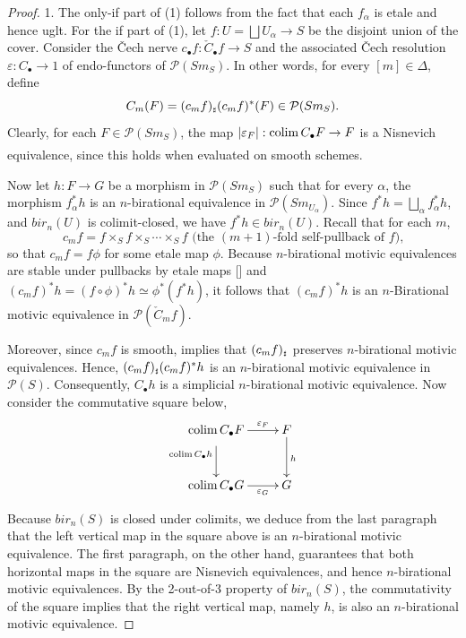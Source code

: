 \begin{proof}
1. The only-if part of (1) follows from the fact that each $f_\alpha$ is etale and hence uglt. For the if part of (1), let $f:U=\bigsqcup U_\alpha \to S$ be the disjoint union of the cover. Consider the \v{C}ech nerve $c_\bullet f: \check{C}_\bullet f \to S$ and the associated \v{C}ech resolution $\varepsilon: C_\bullet\to 1$ of endo-functors of $\mathcal{P}(Sm_S)$. In other words, for every $[m]\in \Delta$, define $$C_m (F)= (c_mf)_{{\mathord{\text{\tiny $\sharp$}}}} (c_mf)^{*}(F)\in \mathcal{P}(Sm_S).$$ Clearly, for each $F\in \mathcal{P}(Sm_S)$, the map  $|\varepsilon_F|: \mathop{\mathrm{colim}}\limits_{}C_\bullet F\to F$  is a Nisnevich equivalence, since this holds when evaluated on smooth schemes. 
      
Now let $h:F\to G$ be a morphism in $\mathcal{P}({Sm_S})$ such that for every $\alpha$, the morphism $f_{\alpha}^{*}h$ is an $n$-birational equivalence in $\mathcal{P}(Sm_{U_\alpha})$. Since $f^*h=\bigsqcup_\alpha f_\alpha^*h$, and $bir_n(U)$ is colimit-closed, we have $f^*h\in bir_n(U)$. Recall that for each $m$, $$c_mf=f\times _Sf\times_S\cdots \times_Sf\text{ (the $(m+1)$-fold self-pullback of }f\text{),}$$ so that $c_mf=f\phi$ for some etale map $\phi$. Because $n$-birational motivic equivalences are stable under pullbacks by etale maps [] and $(c_mf)^*h=(f\circ \phi)^*h\simeq \phi^*(f^*h)$, it follows that $(c_mf)^*h$ is an $n$-Birational motivic equivalence in $\mathcal{P}(\check{C}_mf)$. 


Moreover, since $c_mf$ is smooth,  implies that $(c_mf)_{\mathord{\text{\tiny $\sharp$}}}$ preserves $n$-birational motivic equivalences. Hence, $(c_mf)_{{\mathord{\text{\tiny $\sharp$}}}} (c_mf)^{*}h$ is an $n$-birational motivic equivalence in $\mathcal{P}(S)$. Consequently, $C_\bullet h$ is a simplicial $n$-birational motivic equivalence. Now consider the commutative square below,        \[
    \xymatrix{
    \colim_{}C_\bullet F \ar[r]^-{\varepsilon_F}\ar[d]_{ \colim_{}C_\bullet h}&F\ar[d]^{h}\\
 \colim_{}C_\bullet G \ar[r]_-{\varepsilon_G}&G
    }
    \]
Because $bir_n(S)$ is closed under colimits, we deduce from the last paragraph that the left vertical map in the square above is an $n$-birational motivic equivalence. The first paragraph, on the other hand, guarantees that both horizontal maps in the square are Nisnevich equivalences, and hence $n$-birational motivic equivalences. By the 2-out-of-3 property of $bir_n(S)$, the commutativity of the square implies that the right vertical map, namely $h$, is also an $n$-birational motivic equivalence.


\end{proof}
